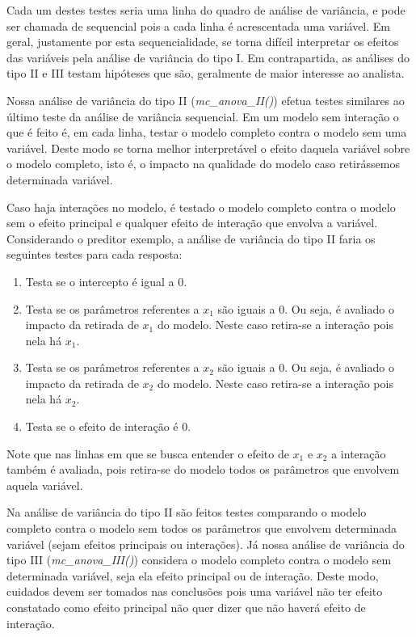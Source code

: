 Cada um destes testes seria uma linha do quadro de análise de variância, e pode ser chamada de sequencial pois a cada linha é acrescentada uma variável. Em geral, justamente por esta sequencialidade, se torna difícil interpretar os efeitos das variáveis pela análise de variância do tipo I. Em contrapartida, as análises do tipo II e III testam hipóteses que são, geralmente de maior interesse ao analista.

Nossa análise de variância do tipo II (\emph{mc\_anova\_II()}) efetua testes similares ao último teste da análise de variância sequencial. Em um modelo sem interação o que é feito é, em cada linha, testar o modelo completo contra o modelo sem uma variável. Deste modo se torna melhor interpretável o efeito daquela variável sobre o modelo completo, isto é, o impacto na qualidade do modelo caso retirássemos determinada variável.

Caso haja interações no modelo, é testado o modelo completo contra o modelo sem o efeito principal e qualquer efeito de interação que envolva a variável. Considerando o preditor exemplo, a análise de variância do tipo II faria os seguintes testes para cada resposta:

\begin{enumerate}
  \item Testa se o intercepto é igual a 0.
  
  \item Testa se os parâmetros referentes a $x_1$ são iguais a 0. Ou seja, é avaliado o impacto da retirada de $x_1$ do modelo. Neste caso retira-se a interação pois nela há $x_1$.
  
  \item Testa se os parâmetros referentes a $x_2$ são iguais a 0. Ou seja, é avaliado o impacto da retirada de $x_2$ do modelo. Neste caso retira-se a interação pois nela há $x_2$.
  
  \item Testa se o efeito de interação é 0.

\end{enumerate}

Note que nas linhas em que se busca entender o efeito de $x_1$ e $x_2$ a interação também é avaliada, pois retira-se do modelo todos os parâmetros que envolvem aquela variável.

Na análise de variância do tipo II são feitos testes comparando o modelo completo contra o modelo sem todos os parâmetros que envolvem determinada variável (sejam efeitos principais ou interações). Já nossa análise de variância do tipo III (\emph{mc\_anova\_III()}) considera o modelo completo contra o modelo sem determinada variável, seja ela efeito principal ou de interação. Deste modo, cuidados devem ser tomados nas conclusões pois uma variável não ter efeito constatado como efeito principal não quer dizer que não haverá efeito de interação.

